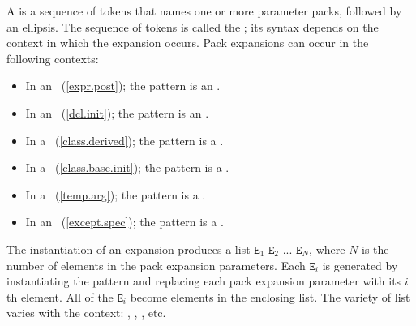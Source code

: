 \documentclass[american]{book}
\begin{document}
\begin{paras}
\setcounter{Paras}{3}
\pnum
\textcolor{black}{A}  is a sequence of tokens that
names one or more parameter packs, followed by an ellipsis. The sequence
of tokens is called the ; its
syntax depends on the context in which the expansion occurs. Pack
expansions can occur in the following contexts:

\begin{itemize}
\item In an \mbox{}~(\mbox{\ref{expr.post}});
the pattern is an \mbox{}.
\item In an \mbox{}~(\mbox{\ref{dcl.init}});
the pattern is an \mbox{}.
\item In a \mbox{}~(\mbox{\ref{class.derived}});
the pattern is a \mbox{}.
\item In a \mbox{}~(\mbox{\ref{class.base.init}});
the pattern is a \mbox{}.
\item In a \mbox{}~(\mbox{\ref{temp.arg}});
the pattern is a \mbox{}.
\item In an \mbox{}~(\mbox{\ref{except.spec}});
the pattern is a \mbox{}.
\end{itemize}

\setcounter{Paras}{5}
\pnum
The instantiation of an expansion produces a 
list $\texttt{E}_1$\changedConcepts{,}{\mbox{$\oplus$}} $\texttt{E}_2$\changedConcepts{,}{\mbox{$\oplus$}} $...$\changedConcepts{,}{\mbox{$\oplus$}} $\texttt{E}_N$, where
$N$ is the number of elements in the pack expansion
parameters. Each
\mbox{$\texttt{E}_i$} is generated by instantiating the pattern and
replacing each pack expansion parameter with its \mbox{$i$}th element.
All of the \mbox{$\texttt{E}_i$} become elements in the enclosing list.
\mbox{\enternote} The variety of list varies with the context:
\mbox{},
\mbox{},
\mbox{}, 
 etc. \mbox{\exitnote}


\end{paras}
\end{document}
